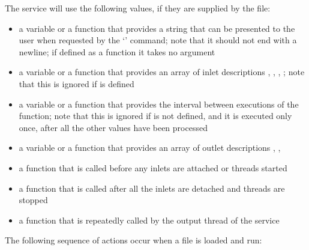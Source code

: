 \secondaryEnd
{}
The \CLF{} service will use the following values, if they are supplied by the \CL{} file:
\begin{itemize}
\item\textbf{} \longDash{} a variable or a function that provides a
string that can be presented to the user when requested by the `' command; note
that it should not end with a newline; if defined as a function it takes no argument
\item\exSp\textbf{} \longDash{} a variable or a function that
provides an array of inlet descriptions \openSq{}, ,
, \closeSq; note that this is ignored if
 is defined
\item\exSp\textbf{} \longDash{} a variable or a function that
provides the interval between executions of the  function; note that
this is ignored if  is not defined, and it is executed only once,
after all the other values have been processed
\item\exSp\textbf{} \longDash{} a variable or a function that
provides an array of outlet descriptions \openSq{}, ,
\closeSq
\item\exSp\textbf{} \longDash{} a function that is called before
any inlets are attached or threads started
\item\exSp\textbf{} \longDash{} a function that is called after all
the inlets are detached and threads are stopped
\item\exSp\textbf{} \longDash{} a function that is repeatedly
called by the output thread of the service
\end{itemize}
\secondaryEnd
\condPage
{}
The following sequence of actions occur when a \CL{} file is loaded and run:
